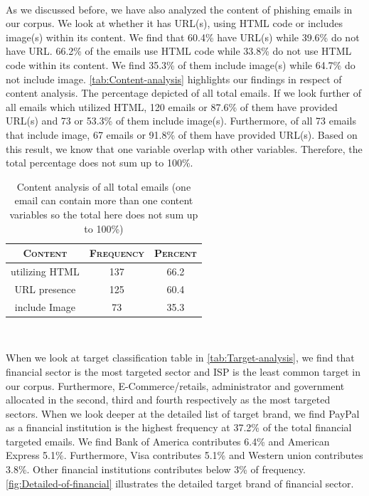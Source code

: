 \ 

As we discussed before, we have also analyzed the content of phishing
emails in our corpus. We look at whether it has URL(s), using HTML
code or includes image(s) within its content. We find that 60.4\%
have URL(s) while 39.6\% do not have URL. 66.2\% of the emails use
HTML code while 33.8\% do not use HTML code within its content. We
find 35.3\% of them include image(s) while 64.7\% do not include image.
\autoref{tab:Content-analysis} highlights our findings in respect
of content analysis. The percentage depicted of all total emails.
If we look further of all emails which utilized HTML, 120 emails or
87.6\% of them have provided URL(s) and 73 or 53.3\% of them include
image(s). Furthermore, of all 73 emails that include image, 67 emails
or 91.8\% of them have provided URL(s). Based on this result, we know
that one variable overlap with other variables. Therefore, the total
percentage does not sum up to 100\%.

\begin{table}[h]
\centering{}%
\begin{tabular}{ccc}
\toprule 
\textsc{\small{}Content} & \textsc{\small{}Frequency} & \textsc{\small{}Percent}\tabularnewline
\midrule
\midrule 
{\small{}utilizing HTML} & {\small{}137} & 66.2\tabularnewline
\midrule 
{\small{}URL presence} & {\small{}125} & 60.4\tabularnewline
\midrule 
{\small{}include Image} & {\small{}73} & {\small{}35.3}\tabularnewline
\bottomrule
\end{tabular}\protect\caption{\label{tab:Content-analysis}Content analysis of all total emails
(one email can contain more than one content variables so the total
here does not sum up to 100\%)}
\end{table}


\ 

When we look at target classification table in \autoref{tab:Target-analysis},
we find that financial sector is the most targeted sector and ISP
is the least common target in our corpus. Furthermore, E-Commerce/retails,
administrator and government allocated in the second, third and fourth
respectively as the most targeted sectors. When we look deeper at
the detailed list of target brand, we find PayPal as a financial institution
is the highest frequency at 37.2\% of the total financial targeted
emails. We find Bank of America contributes 6.4\% and American Express
5.1\%. Furthermore, Visa contributes 5.1\% and Western union contributes
3.8\%. Other financial institutions contributes below 3\% of frequency.
\autoref{fig:Detailed-of-financial} illustrates the detailed target
brand of financial sector.

